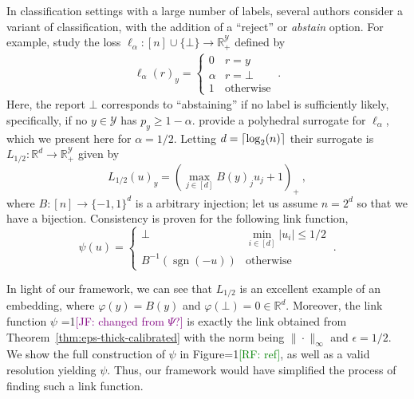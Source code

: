\documentclass[12pt]{article}
\newcommand{\Comments}{1}
\newcommand{\mynote}[2]{\ifnum\Comments=1\textcolor{#1}{#2}\fi}
\newcommand{\raf}[1]{\mynote{green}{[RF: #1]}}
\newcommand{\jessie}[1]{\mynote{purple}{[JF: #1]}}
\newcommand{\reals}{\mathbb{R}}
\newcommand{\Y}{\mathcal{Y}}
\DeclarePairedDelimiter\ceil{\lceil}{\rceil}
\newcommand{\ellabs}[1]{\ell_{#1}}
\DeclareMathOperator*{\sgn}{sgn}
\begin{document}
In classification settings with a large number of labels, several authors consider a variant of classification, with the addition of a ``reject'' or \emph{abstain} option.
For example, \citet{ramaswamy2018consistent} study the loss $\ellabs{\alpha} : [n] \cup \{\bot\} \to \reals^\Y_+$ defined by
\begin{align}\label{eq:abstain-discrete}
\ellabs{\alpha}(r)_y = \begin{cases}
0 & r = y\\
\alpha & r = \bot\\
1 & \text{otherwise}
\end{cases}~.
\end{align}
Here, the report $\bot$ corresponds to ``abstaining'' if no label is sufficiently likely, specifically, if no $y\in\Y$ has $p_y \geq 1-\alpha$.
\citet{ramaswamy2018consistent} provide a polyhedral surrogate for $\ellabs{\alpha}$, which we present here for $\alpha=1/2$.
Letting $d = \ceil{\log_2(n)}$ their surrogate is $L_{1/2} : \reals^d \to \reals^\Y_+$ given by
\begin{equation}\label{eq:abstain-surrogate}
L_{1/2}(u)_y = \left(\max_{j \in [d]}B(y)_j u_j + 1\right)_+~,
\end{equation}
where $B:[n]\to\{-1,1\}^d$ is a arbitrary injection; let us assume $n = 2^d$ so that we have a bijection.
Consistency is proven for the following link function,
\begin{equation}\label{eq:abstain-link}
  \psi(u) = \begin{cases}
	\bot & \min_{i \in [d]} |u_i| \leq 1/2\\
	B^{-1}(\sgn(-u)) &\text{otherwise}
  \end{cases}~.
\end{equation}

In light of our framework, we can see that $L_{1/2}$ is an excellent example of an embedding, where $\varphi(y) = B(y)$ and $\varphi(\bot) = 0 \in \reals^d$.
Moreover, the link function $\psi$ \jessie{changed from $\Psi$?} is exactly the link obtained from Theorem~\ref{thm:eps-thick-calibrated} with the norm being $\|\cdot\|_\infty$ and $\epsilon=1/2$.
We show the full construction of $\psi$ in Figure\raf{ref}, as well as a valid resolution yielding $\psi$.
Thus, our framework would have simplified the process of finding such a link function.
\end{document}
